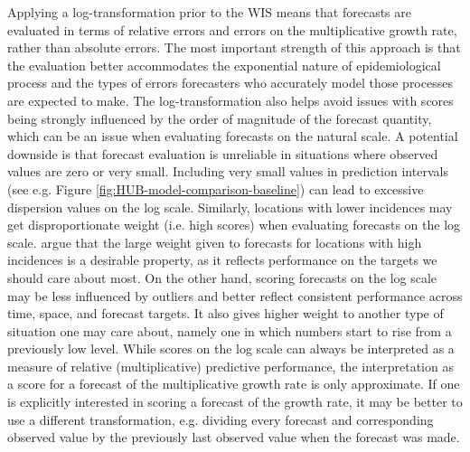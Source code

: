 \documentclass{article}
\begin{document}
Applying a log-transformation prior to the WIS means that forecasts are evaluated in terms of relative errors and errors on the multiplicative growth rate, rather than absolute errors. The most important strength of this approach is that the evaluation better accommodates the exponential nature of epidemiological process and the types of errors forecasters who accurately model those processes are expected to make. The log-transformation also helps avoid issues with scores being strongly influenced by the order of magnitude of the forecast quantity, which can be an issue when evaluating forecasts on the natural scale. 
A potential downside is that forecast evaluation is unreliable in situations where observed values are zero or very small. Including very small values in prediction intervals (see e.g. Figure \ref{fig:HUB-model-comparison-baseline}) can lead to excessive dispersion values on the log scale. 
Similarly, locations with lower incidences may get disproportionate weight (i.e. high scores) when evaluating forecasts on the log scale. \cite{bracherEvaluatingEpidemicForecasts2021} argue that the large weight given to forecasts for locations with high incidences is a desirable property, as it reflects performance on the targets we should care about most. On the other hand, scoring forecasts on the log scale may be less influenced by outliers and better reflect consistent performance across time, space, and forecast targets. It also gives higher weight to another type of situation one may care about, namely one in which numbers start to rise from a previously low level. 
While scores on the log scale can always be interpreted as a measure of relative (multiplicative) predictive performance, the interpretation as a score for a forecast of the multiplicative growth rate is only approximate. If one is explicitly interested in scoring a forecast of the growth rate, it may be better to use a different transformation, e.g. dividing every forecast and corresponding observed value by the previously last observed value when the forecast was made. 
\end{document}

